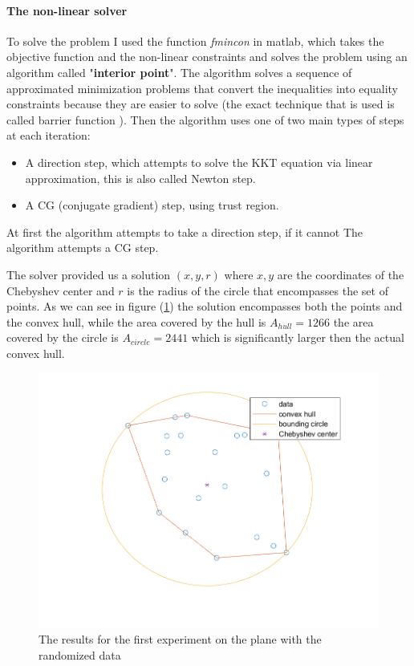 \documentclass[]{article}
\begin{document}
\paragraph{The non-linear solver\\}
To solve the problem I used the function \textit{fmincon} in matlab, which takes the objective function and the non-linear constraints and solves the problem using an algorithm called "\textbf{interior point}". The algorithm solves a sequence of approximated minimization problems that convert the inequalities into equality constraints because they are easier to solve (the exact technique that is used is called barrier function \cite{barrier}). Then the algorithm uses one of two main types of steps at each iteration:
\begin{itemize}
	\item A direction step, which attempts to solve the KKT equation via linear approximation, this is also called Newton step.
	\item A CG (conjugate gradient) step, using trust region.
\end{itemize}
At first the algorithm attempts to take a direction step, if it cannot The algorithm attempts a CG step. \newline

The solver provided us a solution $(x,y,r)$ where $x,y$ are the coordinates of the Chebyshev center and $r$ is the radius of the circle that encompasses the set of points. As we can see in figure (\ref{exp1}) the solution encompasses both the points and the convex hull, while the area covered by the hull is $A_{hull}= 1266$ the area covered by the circle is $A_{circle} = 2441$ which is significantly larger then the actual convex hull.

\begin{figure}[!h]
	\centering
	\includegraphics[width=\textwidth]{bounding}
	\caption{The results for the first experiment on the plane with the randomized data}
	\label{exp1}
\end{figure}
\end{document}
